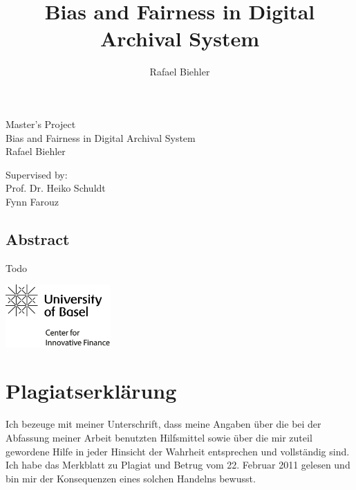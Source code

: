 \documentclass[12pt,a4paper,titlepage,oneside,english]{article}
\title{Bias and Fairness in Digital Archival System}
\author{Rafael Biehler}
\begin{document}
\begin{center}
\vspace{1em}
\large{Master's Project}\\
\huge Bias and Fairness in Digital Archival System \\
\Large \vspace{1em}
Rafael Biehler
\end{center}

\vspace{1em}
\normalsize
\begin{flushleft}
Supervised by:\\ 
Prof. Dr. Heiko Schuldt \\
Fynn Farouz \\ 
\end{flushleft}

\vspace{1em}
\onehalfspacing
\begin{center}
\section*{Abstract}
\end{center}

Todo


\newpage
{}
\tableofcontents

\vfill
\begin{center}
\includegraphics[width=4cm]{../assetlib/images/logo_cif.png}
\end{center}
\singlespacing
\vspace{-1.5cm}

\section*{Plagiatserklärung}

Ich bezeuge mit meiner Unterschrift, dass meine Angaben über die bei der Abfassung meiner Arbeit benutzten Hilfsmittel sowie über die mir zuteil gewordene Hilfe in jeder Hinsicht der Wahrheit entsprechen und vollständig sind. Ich habe das Merkblatt zu Plagiat und Betrug vom 22. Februar 2011 gelesen und bin mir der Konsequenzen eines solchen Handelns bewusst.
\end{document}
